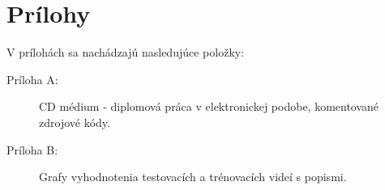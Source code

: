 \chapter*{Prílohy}
V prílohách sa nachádzajú nasledujúce položky:
\begin{description}
	\item [Príloha A:]  CD médium - diplomová práca v elektronickej podobe, komentované zdrojové kódy.
	\item [Príloha B:]  Grafy vyhodnotenia testovacích a trénovacích videí s popismi.
	
	

\end{description}

\appendix
\renewcommand\appendixname{Príloha}

%
